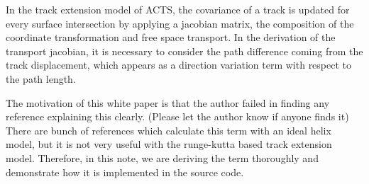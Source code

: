 
In the track extension model of ACTS, the covariance of a track is updated for every surface intersection by applying a jacobian matrix, the composition of the coordinate transformation and free space transport. In the derivation of the transport jacobian, it is necessary to consider the path difference coming from the track displacement, which appears as a direction variation term with respect to the path length. 


The motivation of this white paper is that the author failed in finding any reference explaining this clearly. (Please let the author know if anyone finds it) There are bunch of references which calculate this term with an ideal helix model, but it is not very useful with the runge-kutta based track extension model. Therefore, in this note, we are deriving the term thoroughly and demonstrate how it is implemented in the source code. 

